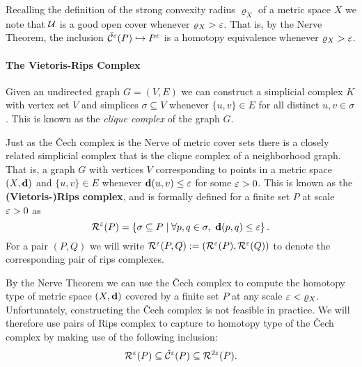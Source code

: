 Recalling the definition of the strong convexity radius $\varrho_X$ of a metric space $X$ we note that $\mathcal{U}$ is a good open cover whenever $\varrho_X > \varepsilon$.
That is, by the Nerve Theorem, the inclusion $\check{\mathcal{C}}^\varepsilon(P)\hookrightarrow P^\varepsilon$ is a homotopy equivalence whenever $\varrho_X > \varepsilon$.

\paragraph{The Vietoris-Rips Complex}

Given an undirected graph $G = (V, E)$ we can construct a simplicial complex $K$ with vertex set $V$ and simplices $\sigma\subseteq V$ whenever $\{u,v\}\in E$ for all distinct $u, v\in\sigma$.
This is known as the \emph{clique complex} of the graph $G$.

Just as the \v Cech complex is the Nerve of metric cover sets there is a closely related simplicial complex that is the clique complex of a neighborhood graph.
That is, a graph $G$ with vertices $V$ corresponding to points in a metric space $(X,\mathbf{d})$ and $\{u,v\}\in E$ whenever $\mathbf{d}(u,v)\leq \varepsilon$ for some $\varepsilon > 0$.
This is known as the \textbf{(Vietoris-)Rips complex}, and is formally defined for a finite set $P$ at scale $\varepsilon > 0$ as
\[ \mathcal{R}^\varepsilon(P) = \left\{\sigma \subseteq P\mid \forall p,q\in\sigma,\ \mathbf{d}(p, q)\leq \varepsilon\right\}. \]
For a pair $(P, Q)$ we will write $\mathcal{R}^\varepsilon(P,Q) := (\mathcal{R}^\varepsilon(P), \mathcal{R}^\varepsilon(Q))$ to denote the corresponding pair of rips complexes.

By the Nerve Theorem we can use the \v Cech complex to compute the homotopy type of metric space $(X, \mathbf{d})$ covered by a finite set $P$ at any scale $\varepsilon < \varrho_X$.
Unfortunately, constructing the \v Cech complex is not feasible in practice.
We will therefore use pairs of Rips complex to capture to homotopy type of the \v Cech complex by making use of the following inclusion:
\[ \mathcal{R}^\varepsilon(P) \subseteq \check{\mathcal{C}}^\varepsilon(P)\subseteq \mathcal{R}^{2\varepsilon}(P).\]
